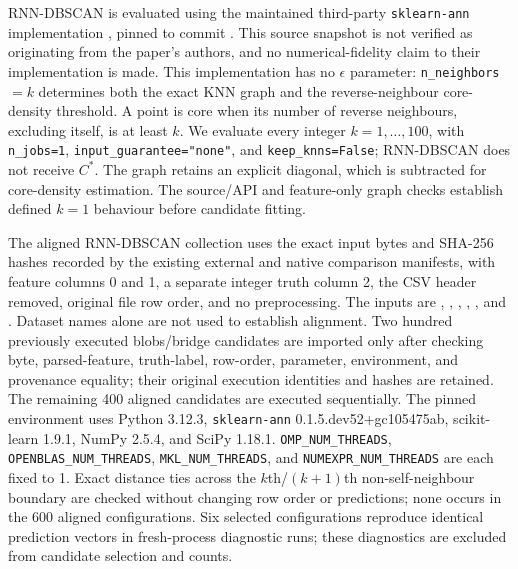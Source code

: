 \documentclass[pdflatex,sn-basic,Numbered]{sn-jnl}
\begin{document}
RNN-DBSCAN \citep{BryantCios2018RNNDBSCAN} is evaluated using the maintained
third-party \texttt{sklearn-ann} implementation \citep{SklearnAnnRNNDBSCAN},
pinned to commit
\texttt{}.
This source snapshot is not verified as originating from the paper's authors,
and no numerical-fidelity claim to their implementation is made. This
implementation has no $\epsilon$ parameter: \texttt{n\_neighbors}$=k$
determines both the exact KNN graph and the reverse-neighbour core-density
threshold. A point is core when its number of reverse neighbours, excluding
itself, is at least $k$. We evaluate every integer $k=1,\ldots,100$, with
\texttt{n\_jobs=1}, \texttt{input\_guarantee="none"}, and
\texttt{keep\_knns=False}; RNN-DBSCAN does not receive $C^*$.
The graph retains an explicit diagonal, which is subtracted for core-density
estimation. The source/API and feature-only graph checks establish defined
$k=1$ behaviour before candidate fitting.

The aligned RNN-DBSCAN collection uses the exact input bytes and SHA-256 hashes
recorded by the existing external and native comparison manifests, with
feature columns 0 and 1, a separate integer truth column 2, the CSV header
removed, original file row order, and no preprocessing. The inputs are
, ,
, ,
, and .
Dataset names alone are not used to establish alignment. Two hundred
previously executed blobs/bridge candidates are imported only after checking
byte, parsed-feature, truth-label, row-order, parameter, environment, and
provenance equality; their original execution identities and hashes are
retained. The remaining 400 aligned candidates are executed sequentially.
The pinned environment uses Python 3.12.3, \texttt{sklearn-ann}
0.1.5.dev52+gc105475ab, scikit-learn 1.9.1, NumPy 2.5.4, and SciPy 1.18.1.
\texttt{OMP\_NUM\_THREADS}, \texttt{OPENBLAS\_NUM\_THREADS},
\texttt{MKL\_NUM\_THREADS}, and \texttt{NUMEXPR\_NUM\_THREADS} are each
fixed to 1. Exact distance ties across the $k$th/$(k+1)$th non-self-neighbour
boundary are checked without changing row order or predictions; none occurs
in the 600 aligned configurations. Six selected configurations reproduce
identical prediction vectors in fresh-process diagnostic runs; these
diagnostics are excluded from candidate selection and counts.
\end{document}
